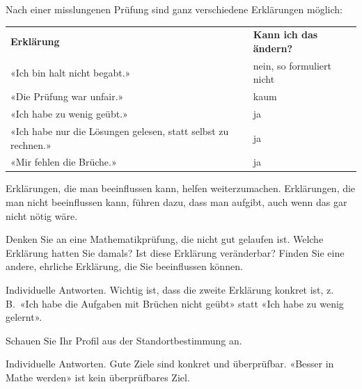 \documentclass[11pt]{exam}
\begin{document}
\begin{beispiel}
Nach einer misslungenen Prüfung sind ganz verschiedene Erklärungen möglich:

\begin{center}
\renewcommand{\arraystretch}{1.4}
\begin{tabular}{p{6.5cm}p{6.5cm}}
  \textbf{Erklärung} & \textbf{Kann ich das ändern?} \\
  «Ich bin halt nicht begabt.»            & nein, so formuliert nicht \\
  «Die Prüfung war unfair.»               & kaum \\
  «Ich habe zu wenig geübt.»              & ja \\
  «Ich habe nur die Lösungen gelesen, statt selbst zu rechnen.» & ja \\
  «Mir fehlen die Brüche.»                & ja
\end{tabular}
\end{center}

Erklärungen, die man beeinflussen kann, helfen weiterzumachen. Erklärungen,
die man nicht beeinflussen kann, führen dazu, dass man aufgibt, auch wenn das
gar nicht nötig wäre.
\end{beispiel}

\begin{questions}

\question Denken Sie an eine Mathematikprüfung, die nicht gut gelaufen ist.
Welche Erklärung hatten Sie damals? Ist diese Erklärung veränderbar? Finden
Sie eine andere, ehrliche Erklärung, die Sie beeinflussen können.
\begin{solution}
  Individuelle Antworten. Wichtig ist, dass die zweite Erklärung konkret ist,
  z.\,B.\ «Ich habe die Aufgaben mit Brüchen nicht geübt» statt «Ich habe zu
  wenig gelernt».
\end{solution}
\zeilen{4cm}

\question Schauen Sie Ihr Profil aus der Standortbestimmung an.
\begin{solution}
  Individuelle Antworten. Gute Ziele sind konkret und überprüfbar. «Besser in
  Mathe werden» ist kein überprüfbares Ziel.
\end{solution}
\zeilen{5cm}

\end{questions}
\end{document}
